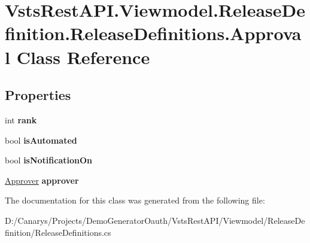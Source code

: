 \hypertarget{class_vsts_rest_a_p_i_1_1_viewmodel_1_1_release_definition_1_1_release_definitions_1_1_approval}{}\section{Vsts\+Rest\+A\+P\+I.\+Viewmodel.\+Release\+Definition.\+Release\+Definitions.\+Approval Class Reference}
\label{class_vsts_rest_a_p_i_1_1_viewmodel_1_1_release_definition_1_1_release_definitions_1_1_approval}
\subsection*{Properties}
\begin{DoxyCompactItemize}
\item 
\mbox{\label{class_vsts_rest_a_p_i_1_1_viewmodel_1_1_release_definition_1_1_release_definitions_1_1_approval_a738f28ccdd552ca533e0a08f3668f935}} 
int {\bfseries rank}
\item 
\mbox{\label{class_vsts_rest_a_p_i_1_1_viewmodel_1_1_release_definition_1_1_release_definitions_1_1_approval_a95c3867f012b34bf522b32927c041990}} 
bool {\bfseries is\+Automated}
\item 
\mbox{\label{class_vsts_rest_a_p_i_1_1_viewmodel_1_1_release_definition_1_1_release_definitions_1_1_approval_a8c4101d10d4d2a503161a672e1d09843}} 
bool {\bfseries is\+Notification\+On}
\item 
\mbox{\label{class_vsts_rest_a_p_i_1_1_viewmodel_1_1_release_definition_1_1_release_definitions_1_1_approval_aa008882e47635065f657f6bebbb419ca}} 
\mbox{\hyperlink{class_vsts_rest_a_p_i_1_1_viewmodel_1_1_release_definition_1_1_release_definitions_1_1_approver}{Approver}} {\bfseries approver}
\end{DoxyCompactItemize}


The documentation for this class was generated from the following file\+:\begin{DoxyCompactItemize}
\item 
D\+:/\+Canarys/\+Projects/\+Demo\+Generator\+Oauth/\+Vsts\+Rest\+A\+P\+I/\+Viewmodel/\+Release\+Definition/Release\+Definitions.\+cs\end{DoxyCompactItemize}
